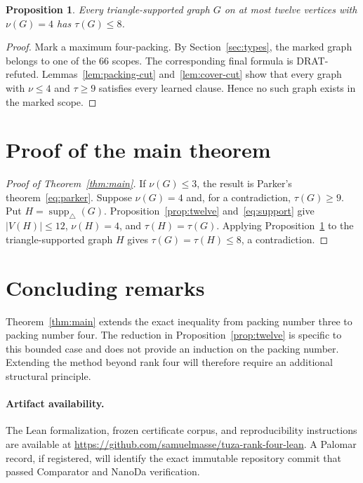 \documentclass[11pt]{article}
\newtheorem{proposition}[theorem]{Proposition}
\theoremstyle{definition}
\newcommand{\supp}{\operatorname{supp}_{\triangle}}
\begin{document}
\begin{proposition}\label{prop:finite}
Every triangle-supported graph $G$ on at most twelve vertices with
$\nu(G)=4$ has $\tau(G)\leq8$.
\end{proposition}

\begin{proof}
Mark a maximum four-packing.  By Section~\ref{sec:types}, the marked graph
belongs to one of the 66 scopes.  The corresponding final formula is
DRAT-refuted.  Lemmas~\ref{lem:packing-cut} and~\ref{lem:cover-cut} show that
every graph with $\nu\leq4$ and $\tau\geq9$ satisfies every learned clause.
Hence no such graph exists in the marked scope.
\end{proof}

\section{Proof of the main theorem}

\begin{proof}[Proof of Theorem~\ref{thm:main}]
If $\nu(G)\leq3$, the result is Parker's theorem~\eqref{eq:parker}.  Suppose
$\nu(G)=4$ and, for a contradiction, $\tau(G)\geq9$.  Put
$H=\supp(G)$.  Proposition~\ref{prop:twelve} and~\eqref{eq:support} give
$|V(H)|\leq12$, $\nu(H)=4$, and $\tau(H)=\tau(G)$.  Applying
Proposition~\ref{prop:finite} to the triangle-supported graph $H$ gives
$\tau(G)=\tau(H)\leq8$, a contradiction.
\end{proof}

\section{Concluding remarks}

Theorem~\ref{thm:main} extends the exact inequality from packing number three
to packing number four.  The reduction in Proposition~\ref{prop:twelve} is
specific to this bounded case and does not provide an induction on the packing
number.  Extending the method beyond rank four will therefore require an
additional structural principle.

\paragraph{Artifact availability.}
The Lean formalization, frozen certificate corpus, and reproducibility
instructions are available at
\url{https://github.com/samuelmasse/tuza-rank-four-lean}.  A Palomar record, if
registered, will identify the exact immutable repository commit that passed
Comparator and NanoDa verification.
\end{document}
